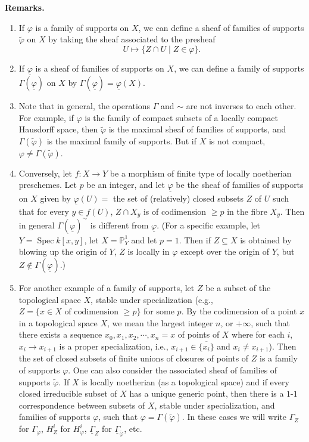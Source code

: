 \par\medskip\noindent\textbf{Remarks.}
\begin{enumerate}
\item If $\varphi$ is a family of supports on $X$, we can define a sheaf of families of supports $\widetilde{\varphi}$ on $X$ by taking the sheaf associated to the presheaf
\[
U\longmapsto \{Z\cap U\mid Z\in\varphi\}.
\]
\item If $\underline{\varphi}$ is a sheaf of families of supports on $X$, we can define a family of supports $\Gamma(\underline{\varphi})$ on $X$ by $\Gamma(\underline{\varphi})=\underline{\varphi}(X)$.
\item Note that in general, the operations $\Gamma$ and $\sim$ are not inverses to each other. For example, if $\varphi$ is the family of compact subsets of a locally compact Hausdorff space, then $\widetilde{\varphi}$ is the maximal sheaf of families of supports, and $\Gamma(\widetilde{\varphi})$ is the maximal family of supports. But if $X$ is not compact, $\varphi\neq\Gamma(\widetilde{\varphi})$.
\item Conversely, let $f\colon X\to Y$ be a morphism of finite type of locally noetherian preschemes. Let $p$ be an integer, and let $\underline{\varphi}$ be the sheaf of families of supports on $X$ given by $\underline{\varphi}(U)=$ the set of (relatively) closed subsets $Z$ of $U$ such that for every $y\in f(U)$, $Z\cap X_y$ is of codimension $\geq p$ in the fibre $X_y$. Then in general $\Gamma(\underline{\varphi})^{\sim}$ is different from $\underline{\varphi}$. (For a specific example, let $Y=\operatorname{Spec}k[x,y]$, let $X=\mathbb{P}^1_Y$ and let $p=1$. Then if $Z\subseteq X$ is obtained by blowing up the origin of $Y$, $Z$ is locally in $\varphi$ except over the origin of $Y$, but $Z\notin \Gamma(\underline{\varphi})$.)
\item{}\label{rem:4.1.var5.5} For another example of a family of supports, let $Z$ be a subset of the topological space $X$, stable under specialization (e.g., $Z=\{x\in X\text{ of codimension }\geq p\}$ for some $p$. By the codimension of a point $x$ in a topological space $X$, we mean the largest integer $n$, or $+\infty$, such that there exists a sequence $x_0,x_1,x_2,\cdots,x_n=x$ of points of $X$ where for each $i$, $x_i\to x_{i+1}$ is a proper specialization, i.e., $x_{i+1}\in\overline{\{x_i\}}$ and $x_i\neq x_{i+1}$). Then the set of closed subsets of finite unions of closures of points of $Z$ is a family of supports $\varphi$. One can also consider the associated sheaf of families of supports $\widetilde{\varphi}$. If $X$ is locally noetherian (as a topological space) and if every closed irreducible subset of $X$ has a unique generic point, then there is a $1$-$1$ correspondence between subsets of $X$, stable under specialization, and families of supports $\varphi$, such that $\varphi=\Gamma(\widetilde{\varphi})$. In these cases we will write $\Gamma_Z$ for $\Gamma_{\varphi}$, $H_Z^i$ for $H_{\varphi}^i$, $\underline{\Gamma}_Z$ for $\underline{\Gamma}_{\widetilde{\varphi}}$, etc.
\end{enumerate}
\par\medskip

